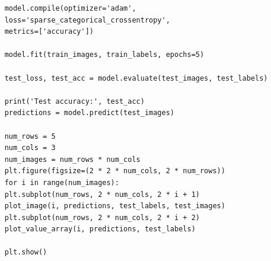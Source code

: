 \begin{verbatim}
	model.compile(optimizer='adam',
	loss='sparse_categorical_crossentropy',
	metrics=['accuracy'])
	
	model.fit(train_images, train_labels, epochs=5)
	
	test_loss, test_acc = model.evaluate(test_images, test_labels)
	
	print('Test accuracy:', test_acc)
	predictions = model.predict(test_images)
	
	num_rows = 5
	num_cols = 3
	num_images = num_rows * num_cols
	plt.figure(figsize=(2 * 2 * num_cols, 2 * num_rows))
	for i in range(num_images):
	plt.subplot(num_rows, 2 * num_cols, 2 * i + 1)
	plot_image(i, predictions, test_labels, test_images)
	plt.subplot(num_rows, 2 * num_cols, 2 * i + 2)
	plot_value_array(i, predictions, test_labels)
	
	plt.show()
	\end{verbatim}
	
	